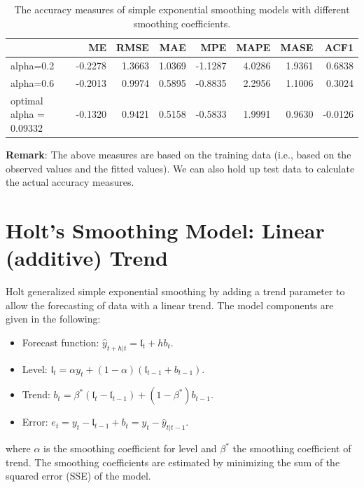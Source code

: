 \documentclass[
]{book}
\begin{document}
\begin{table}

\caption{\label{tab:unnamed-chunk-240}The accuracy measures of simple exponential 
      smoothing models with different smoothing coefficients.}
\centering
\begin{tabular}[t]{l|r|r|r|r|r|r|r}
\hline
  & ME & RMSE & MAE & MPE & MAPE & MASE & ACF1\\
\hline
alpha=0.2 & -0.2278 & 1.3663 & 1.0369 & -1.1287 & 4.0286 & 1.9361 & 0.6838\\
\hline
alpha=0.6 & -0.2013 & 0.9974 & 0.5895 & -0.8835 & 2.2956 & 1.1006 & 0.3024\\
\hline
optimal alpha = 0.09332 & -0.1320 & 0.9421 & 0.5158 & -0.5833 & 1.9991 & 0.9630 & -0.0126\\
\hline
\end{tabular}
\end{table}

\textbf{Remark}: The above measures are based on the training data (i.e., based on the observed values and the fitted values). We can also hold up test data to calculate the actual accuracy measures.

\hypertarget{holts-smoothing-model-linear-additive-trend}{%
\section{Holt's Smoothing Model: Linear (additive) Trend}\label{holts-smoothing-model-linear-additive-trend}}

Holt generalized simple exponential smoothing by adding a trend parameter to allow the forecasting of data with a linear trend. The model components are given in the following:

\begin{itemize}
\item
  Forecast function: \(\hat{y}_{t+h|t} = \mathfrak{l}_t + h b_t\).
\item
  Level: \(\mathfrak{l}_t = \alpha y_t + (1-\alpha)(\mathfrak{l}_{t-1} + b_{t-1})\).
\item
  Trend: \(b_t=\beta^*(\mathfrak{l}_t-\mathfrak{l}_{t-1}) + (1-\beta^*)b_{t-1}\).
\item
  Error: \(e_t = y_t-{\mathfrak{l}_{t-1} + b_t} = y_t-\hat{y}_{t|t-1}\).
\end{itemize}

where \(\alpha\) is the smoothing coefficient for level and \(\beta^*\) the smoothing coefficient of trend. The smoothing coefficients are estimated by minimizing the sum of the squared error (SSE) of the model.
\end{document}
